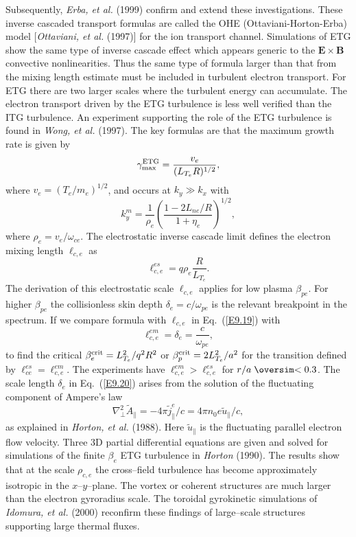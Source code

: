 \documentclass[a4paper,openany,12pt]{book}
\def\nms{\mathsurround=0pt}
\def\ltsim{\mathrel{\mathpalette\oversim<}} %
\def\oversim#1#2{\lower 2pt\vbox{\baselineskip 0pt \lineskip 1pt
    \ialign{$\nms#1\hfil##\hfil$\crcr#2\crcr\sim\crcr}}}
\begin{document}
Subsequently, \emph{Erba, et al.} (1999) confirm and extend these investigations. These inverse cascaded transport formulas are called the OHE (Ottaviani-Horton-Erba) model [\emph{Ottaviani, et al.} (1997)] for the ion transport channel. Simulations of ETG show the same type of inverse cascade effect which appears generic to the $\bm{E\times B}$ convective nonlinearities. Thus the same type of formula larger than that from the mixing length estimate must be included in turbulent electron transport. For ETG there are two larger scales where the turbulent energy can accumulate. The electron transport driven by the ETG turbulence is less well verified than the ITG turbulence. An experiment supporting the role of the ETG turbulence is found in \emph{Wong, et al.} (1997). The key formulas are that the maximum growth rate is given by
\begin{equation}
\gamma_{\rm max}^{\rm ETG}=\frac{v_e}{(L_{T_e}R)^{1/2}},\label{E9.17}
\end{equation}
where $v_e=(T_e/m_e)^{1/2}$, and occurs at $k_y\gg k_x$ with
\begin{equation}
k_y^m=\frac{1}{\rho_e}\left(\frac{1-2L_{ne}/R}{1+\eta_e}\right)^{1/2},\label{E9.18}
\end{equation}
where $\rho_e=v_e/\omega_{ce}$. The electrostatic inverse cascade limit defines the electron mixing length $\ell_{c,e}$ as
\begin{equation}
\ell_{c,e}^{es}=q\rho_e\frac{R}{L_{T_e}}.\label{E9.19}
\end{equation}
The derivation of this electrostatic scale $\ell_{c,e}$ applies for low plasma 
$\beta_{pe}$. For higher $\beta_{pe}$ the collisionless skin depth 
$\delta_e=c/\omega_{pe}$ is the relevant breakpoint in the spectrum. If we compare formula with $\ell_{c,e}$ in Eq.~(\ref{E9.19}) with
\begin{equation}
\ell_{c,e}^{em}=\delta_e=\frac{c}{\omega_{pe}},\label{E9.20}
\end{equation}
to find the critical $\beta_e^{\rm crit}=L_{T_e}^2/q^2R^2$ or $\beta_p^{\rm crit}=2L_{T_e}^2/
a^2$ for the transition defined by $\ell_{ce}^{es}=\ell_{c,e}^{em}$. The experiments have 
$\ell_{c,e}^{em}>\ell_{c,e}^{es}$ for $r/a\ltsim 0.3$. The scale length $\delta_e$ in Eq.~(\ref{E9.20}) arises from the solution of the fluctuating component of Ampere's law
\begin{equation}
\nabla_\perp^2\widetilde A_\|=-4\pi\widetilde j_\|^e/c=4\pi n_0 e\widetilde u_\|/c,\label{E9.21}
\end{equation}
as explained in \emph{Horton, et al.} (1988). Here $\widetilde u_\|$ is the fluctuating parallel electron flow velocity. Three 3D partial differential equations are given and solved for simulations of the finite $\beta_e$ ETG turbulence in \emph{Horton} (1990). The results show that at the scale $\rho_{c,e}$ the cross--field turbulence has become approximately isotropic in the $x$--$y$--plane. The vortex or coherent structures are much larger than the electron gyroradius scale. The toroidal gyrokinetic simulations of \emph{Idomura, et al.} (2000) reconfirm these findings of large--scale structures supporting large thermal fluxes. 
\end{document}
